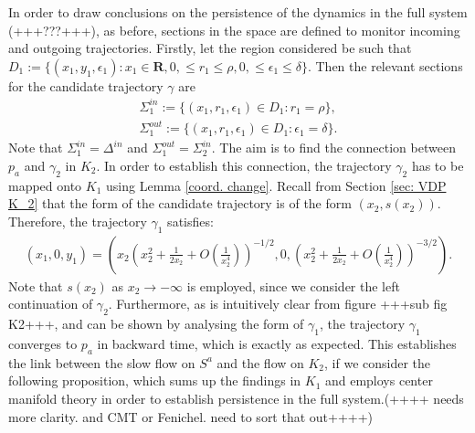 In order to draw conclusions on the persistence of the dynamics in the full system (+++???+++), as before, sections in the space are defined to monitor incoming and outgoing trajectories.
Firstly, let the region considered be such that
$D_1:= \{ (x_1,y_1,\epsilon_1): x_1 \in \mathbf{R}, 0, \leq r_1 \leq \rho, 0, \leq\epsilon_1 \leq \delta\}$.
Then the relevant sections for the candidate trajectory $\gamma$ are
\begin{align*}
\Sigma^{in}_1 := \{ (x_1,r_1, \epsilon_1) \in D_1 : r_1 = \rho \}, \\
\Sigma^{out}_1 := \{ (x_1,r_1, \epsilon_1) \in D_1 : \epsilon_1=\delta \}.
\end{align*}
Note that $\Sigma^{in}_1 = \Delta^{in}$ and $\Sigma^{out}_1=\Sigma^{in}_2$.
The aim is to find the connection between $p_a$ and $\gamma_2$ in $K_2$. In order to establish this connection, the trajectory $\gamma_2$ has to be mapped onto $K_1$ using Lemma \ref{coord. change}. Recall from Section \ref{sec: VDP K_2} that the form of the candidate trajectory is of the form $(x_2, s(x_2))$.
Therefore, the trajectory $\gamma_1$ satisfies:
\begin{align*}
(x_1, 0, y_1) = \left(x_2 \left(x_2^2 + \frac{1}{2x_2} + O\left(\frac{1}{x_2^4} \right) \right)^{-1/2}, 0, \left(x_2^2 + \frac{1}{2x_2} + O\left(\frac{1}{x_2^4} \right)\right)^{-3/2} \right).
\end{align*}
Note that $s(x_2)$ as $x_2 \to - \infty$ is employed, since we consider the left continuation of $\gamma_2$.
Furthermore, as is intuitively clear from figure +++sub fig K2+++, and can be shown by analysing the form of $\gamma_1$, the trajectory $\gamma_1$ converges to $p_a$ in backward time, which is exactly as expected.
This establishes the link between the slow flow on $S^a$ and the flow on $K_2$, if we consider the following proposition, which sums up the findings in $K_1$ and employs center manifold theory in order to establish persistence in the full system.(++++ needs more clarity. and CMT or Fenichel. need to sort that out++++)
